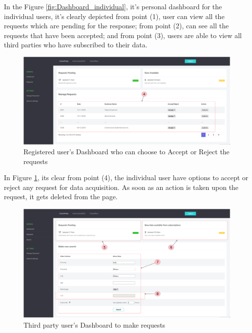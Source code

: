 \documentclass[a4paper, hidelinks, 12pt]{report}
\begin{document}
	In the Figure \ref{fig:Dashboard_individual}, it's personal dashboard for the individual users, it's clearly depicted from point (1), user can view all the requests which are pending for the response; from point (2), can see all the requests that have been accepted; and from point (3), users are able to view all third parties who have subscribed to their data.
	
	\begin{figure}[H]
		\centering
		\includegraphics[width=1\textwidth]{Diagrams/ui/registered_user_manage_requests.png}
		\caption[UI: Registered user's Dashboard who can choose to Accept or Reject the requests]{Registered user's Dashboard who can choose to Accept or Reject the requests}
		\label{fig:Individual_Request}
	\end{figure}
	
	In Figure \ref{fig:Individual_Request}, its clear from point (4), the individual user have options to accept or reject any request for data acquisition. As soon as an action is taken upon the request, it gets deleted from the page.\\
	
	\begin{figure}[H]
		\centering
		\includegraphics[width=1\textwidth]{Diagrams/ui/registered_tp_search.png}\caption[UI: Third party user's Dashboard to make requests]{Third party user's Dashboard to make requests}
		\label{fig:Make_Request}
	\end{figure}
	
\end{document}

